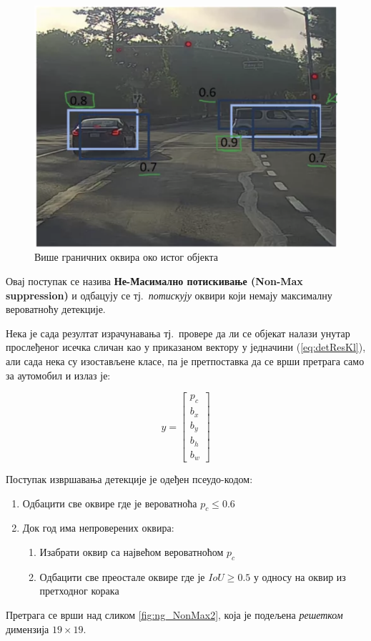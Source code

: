 \documentclass[12pt, а4paper]{article}
\begin{document}
\begin{figure}[H]
  \centering
      \includegraphics[scale=0.55]{slike/ngNonMax1.png}
  \caption{Више граничних оквира око истог објекта}
  \label{fig:ng_NonMax1}
\end{figure}

Овај поступак се назива \textbf{Не-Масимално потискивање (Non-Max suppression)}
и одбацују се тј.\ \textit{потискују} оквири који немају максималну вероватноћу
детекције.

Нека је сада резултат израчунавања тј.\ провере да ли се објекат налази
унутар прослеђеног исечка сличан као у приказаном вектору у
једначини (\ref{eq:detResKl}), али сада нека су изостављене класе, па
је претпоставка да се врши претрага само за аутомобил и излаз је:

\begin{equation}
y =
\begin{bmatrix}
 p_c \\
 b_x \\
 b_y \\
 b_h \\
 b_w
\end{bmatrix}
\label{eq:detRes}
\end{equation}

Поступак извршавања детекције је одеђен \mbox{псеудо-кодом}:
\begin{enumerate}[label=\arabic*)]
\item Одбацити све оквире где је вероватноћа $p_c \leq 0.6$
\item Док год има непроверених оквира:
  \begin{enumerate}[label=(\roman*)]
  \item Изабрати оквир са највећом вероватноћом $p_c$
  \item Одбацити све преостале оквире где је $IoU \geq 0.5$ у односу на
  оквир из претходног корака
  \end{enumerate}
\end{enumerate}
\newpage
Претрага се врши над сликом \ref{fig:ng_NonMax2}, која је подељена
\textit{решетком} димензија $19 \times 19$.
\end{document}
